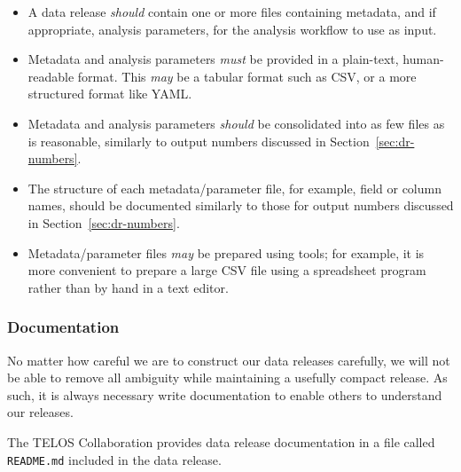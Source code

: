 \documentclass{article}
\newcommand\rfcword[1]{\emph{#1}\xspace}
\newcommand\must{\rfcword{must}}
\newcommand\should{\rfcword{should}}
\newcommand\may{\rfcword{may}}
\newcommand\filename[1]{\texttt{#1}\xspace}
\begin{document}
\begin{itemize}
  \item
        A data release \should contain one or more files containing metadata,
        and if appropriate,
        analysis parameters,
        for the analysis workflow to use as input.
  \item
        Metadata and analysis parameters \must be provided in a plain-text,
        human-readable format.
        This \may be a tabular format such as CSV,
        or a more structured format like YAML\@.
  \item
        Metadata and analysis parameters \should be consolidated into as few files as is reasonable,
        similarly to output numbers discussed in Section~\ref{sec:dr-numbers}.
  \item
        The structure of each metadata/parameter file,
        for example,
        field or column names,
        should be documented similarly to those for output numbers
        discussed in Section~\ref{sec:dr-numbers}.
  \item
        Metadata/parameter files \may be prepared using tools;
        for example,
        it is more convenient to prepare a large CSV file using a spreadsheet program
        rather than by hand in a text editor.
\end{itemize}


\subsubsection{Documentation}\label{sec:dr-documentation}

No matter how careful we are to construct our data releases carefully,
we will not be able to remove all ambiguity while maintaining a usefully compact release.
As such,
it is always necessary write documentation to enable others to understand our releases.

The TELOS Collaboration provides data release documentation in a file called \filename{README.md}
included in the data release.
\end{document}
